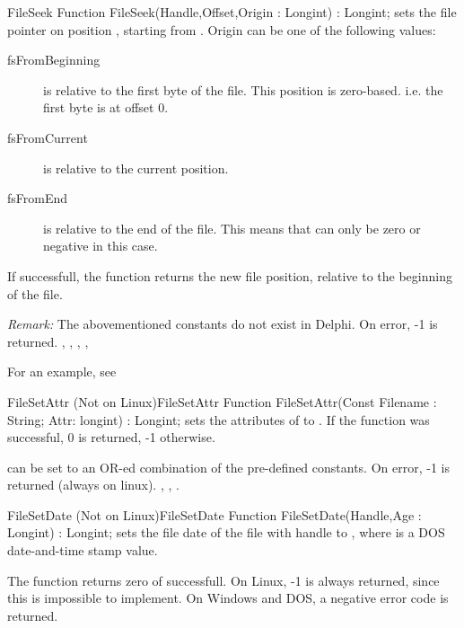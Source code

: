 

\begin{function}{FileSeek}
\Declaration
Function FileSeek(Handle,Offset,Origin : Longint) : Longint;
\Description
{} sets the file pointer on position , starting from 
. Origin can be one of the following values: 
\begin{description}
\item[fsFromBeginning]   is relative to the first byte of the file. This
position is zero-based. i.e. the first byte is at offset 0.
\item[fsFromCurrent]   is relative to the current position.
\item[fsFromEnd]  is relative to the end of the file. This means
that  can only be zero or negative in this case.
\end{description}
If successfull, the function returns the new file position, relative to the
beginning of the file.

{\em Remark:} The abovementioned constants do not exist in Delphi.
\Errors
On error, -1 is returned.
\SeeAlso
{}, , , 
, 
\end{function}



For an example, see 
 
\begin{functionl}{FileSetAttr (Not on Linux)}{FileSetAttr}
\Declaration
Function FileSetAttr(Const Filename : String; Attr: longint) : Longint;
\Description
{} sets the attributes of  to .
If the function was successful, 0 is returned, -1 otherwise.

 can be set to an OR-ed combination of the pre-defined 
 constants.
\Errors
On error, -1 is returned (always on linux). 
\SeeAlso
{}, , .
\end{functionl}

 
\begin{functionl}{FileSetDate (Not on Linux)}{FileSetDate}
\Declaration
Function FileSetDate(Handle,Age : Longint) : Longint;
\Description
{} sets the file date of the file with handle  
to , where  is a DOS date-and-time stamp value.

The function returns zero of successfull.
\Errors
On Linux, -1 is always returned, since this is impossible to implement.
On Windows and DOS, a negative error code is returned.
\SeeAlso
\end{functionl}


